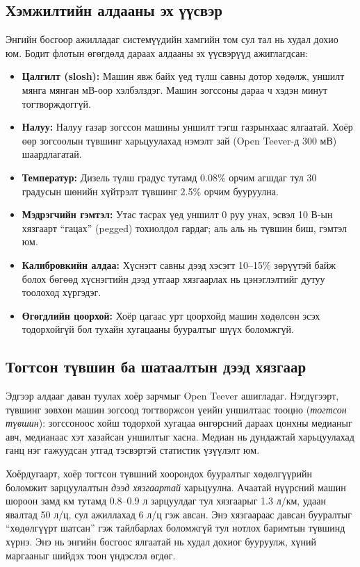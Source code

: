 \documentclass[
12pt,
oneside,
english,
onehalfspacing,
nolistspacing,
headsepline,
]{MUST-Thesis}
\begin{document}
\subsection{Хэмжилтийн алдааны эх үүсвэр}

Энгийн босгоор ажилладаг системүүдийн хамгийн том сул тал нь худал дохио юм. Бодит флотын өгөгдөлд дараах алдааны эх үүсвэрүүд ажиглагдсан:
\begin{itemize}
    \item \textbf{Цалгилт (slosh):} Машин явж байх үед түлш савны дотор хөдөлж, уншилт мянга мянган мВ-оор хэлбэлздэг. Машин зогссоны дараа ч хэдэн минут тогтворждоггүй.
    \item \textbf{Налуу:} Налуу газар зогссон машины уншилт тэгш газрынхаас ялгаатай. Хоёр өөр зогсоолын түвшинг харьцуулахад нэмэлт зай (Open Teever-д 300 мВ) шаардлагатай.
    \item \textbf{Температур:} Дизель түлш градус тутамд 0.08\% орчим агшдаг тул 30 градусын шөнийн хүйтрэлт түвшинг 2.5\% орчим бууруулна.
    \item \textbf{Мэдрэгчийн гэмтэл:} Утас тасрах үед уншилт 0 руу унах, эсвэл 10 В-ын хязгаарт ``гацах'' (pegged) тохиолдол гардаг; аль аль нь түвшин биш, гэмтэл юм.
    \item \textbf{Калибровкийн алдаа:} Хүснэгт савны дээд хэсэгт 10--15\% зөрүүтэй байж болох бөгөөд хүснэгтийн дээд утгаар хязгаарлах нь цэнэглэлтийг дутуу тоолоход хүргэдэг.
    \item \textbf{Өгөгдлийн цоорхой:} Хоёр цагаас урт цоорхойд машин хөдөлсөн эсэх тодорхойгүй бол тухайн хугацааны бууралтыг шүүх боломжгүй.
\end{itemize}

\subsection{Тогтсон түвшин ба шатаалтын дээд хязгаар}

Эдгээр алдааг даван туулах хоёр зарчмыг Open Teever ашигладаг. Нэгдүгээрт, түвшинг зөвхөн машин зогсоод тогтворжсон үеийн уншилтаас тооцно (\textit{тогтсон түвшин}): зогссоноос хойш тодорхой хугацаа өнгөрсний дараах цонхны медианыг авч, медианаас хэт хазайсан уншилтыг хасна. Медиан нь дундажтай харьцуулахад ганц нэг гажуудсан утгад тэсвэртэй статистик үзүүлэлт юм.

Хоёрдугаарт, хоёр тогтсон түвшний хоорондох бууралтыг хөдөлгүүрийн боломжит зарцуулалтын \textit{дээд хязгаартай} харьцуулна. Ачаатай нүүрсний машин шороон замд км тутамд 0.8--0.9 л зарцуулдаг тул хязгаарыг 1.3 л/км, удаан явалтад 50 л/ц, сул ажиллахад 6 л/ц гэж авсан. Энэ хязгаараас давсан бууралтыг ``хөдөлгүүрт шатсан'' гэж тайлбарлах боломжгүй тул нотлох баримтын түвшинд хүрнэ. Энэ нь энгийн босгоос ялгаатай нь худал дохиог бууруулж, хүний маргааныг шийдэх тоон үндэслэл өгдөг.
\end{document}
